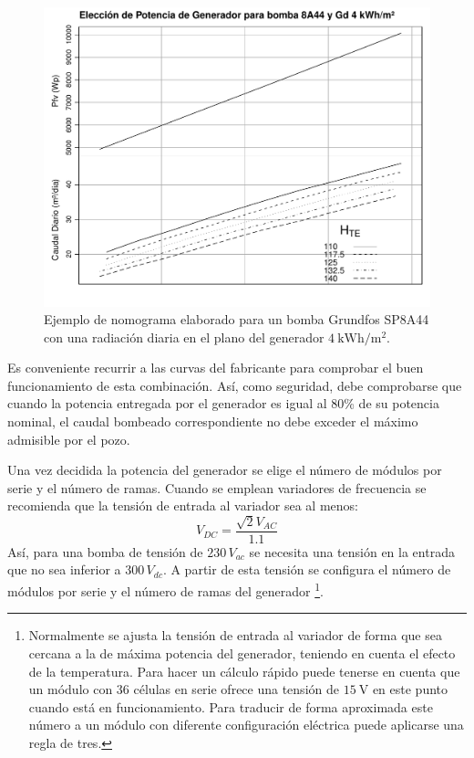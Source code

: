 %
\begin{figure}
  \includegraphics[scale=0.75]{../figs/AbacoBomba}

  \caption[Ejemplo de nomograma para sistemas de bombeo.]{Ejemplo de
    nomograma elaborado para un bomba Grundfos SP8A44 con una
    radiación diaria en el plano del generador
    $\SI{4}{\kWh\per\meter\squared}$.\label{fig:Ejemplo-de-nomograma}
  }



\end{figure}

Es conveniente recurrir a las curvas del fabricante para comprobar el
buen funcionamiento de esta combinación. Así, como seguridad, debe
comprobarse que cuando la potencia entregada por el generador es igual
al 80\% de su potencia nominal, el caudal bombeado correspondiente no
debe exceder el máximo admisible por el pozo.

Una vez decidida la potencia del generador se elige el número de
módulos por serie y el número de ramas. Cuando se emplean variadores
de frecuencia se recomienda que la tensión de entrada al variador sea
al menos:\begin{equation}
  V_{DC}=\frac{\sqrt{2}V_{AC}}{1.1}\end{equation} Así, para una bomba
de tensión de $230\, V_{ac}$ se necesita una tensión en la entrada que
no sea inferior a $300\, V_{dc}$. A partir de esta tensión se
configura el número de módulos por serie y el número de ramas del
generador%
\footnote{Normalmente se ajusta la tensión de entrada al variador de
  forma que sea cercana a la de máxima potencia del generador,
  teniendo en cuenta el efecto de la temperatura. Para hacer un
  cálculo rápido puede tenerse en cuenta que un módulo con 36 células
  en serie ofrece una tensión de $\SI{15}{\volt}$ en este punto cuando
  está en funcionamiento.  Para traducir de forma aproximada este
  número a un módulo con diferente configuración eléctrica puede
  aplicarse una regla de tres.%
}.

